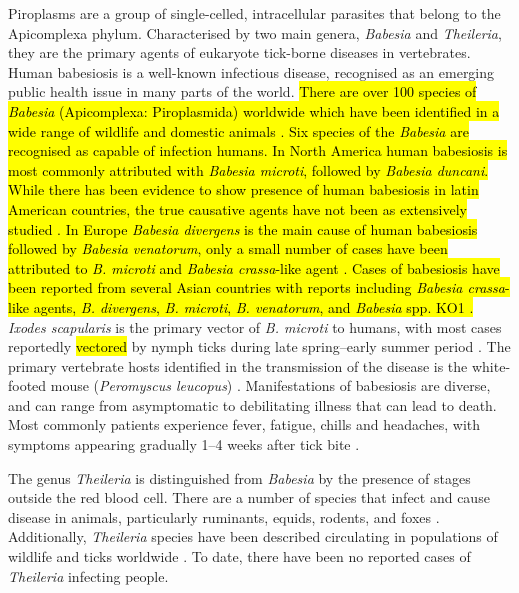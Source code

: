 \documentclass[a4paper, nobind]{templates/ociamthesis}
\begin{document}
Piroplasms are a group of single-celled, intracellular parasites that belong to the Apicomplexa phylum.
Characterised by two main genera, \emph{Babesia} and \emph{Theileria}, they are the primary agents of eukaryote tick-borne diseases in vertebrates.
Human babesiosis is a well-known infectious disease, recognised as an emerging public health issue in many parts of the world.
\hl{There are over 100 species of \emph{Babesia} (Apicomplexa: Piroplasmida) worldwide which have been identified in a wide range of wildlife and domestic animals \autocite{kumarGlobalEmergenceHuman2021}. Six species of the \emph{Babesia} are recognised as capable of infection humans. In North America human babesiosis is most commonly attributed with \emph{Babesia microti}, followed by \emph{Babesia duncani}. While there has been evidence to show presence of human babesiosis in latin American countries, the true causative agents have not been as extensively studied \autocite{kumarGlobalEmergenceHuman2021}. In Europe \emph{Babesia divergens} is the main cause of human babesiosis followed by \emph{Babesia venatorum}, only a small number of cases have been attributed to \emph{B. microti} and \emph{Babesia crassa}-like agent \autocite{hildebrandtHumanBabesiosisEurope2021,vannierHumanBabesiosis2012}. Cases of babesiosis have been reported from several Asian countries with reports including \emph{Babesia crassa}-like agents, \emph{B. divergens}, \emph{B. microti}, \emph{B. venatorum}, and \emph{Babesia} spp. KO1 \autocite{kumarGlobalEmergenceHuman2021}.}
\emph{Ixodes scapularis} is the primary vector of \emph{B. microti} to humans, with most cases reportedly \hl{vectored} by nymph ticks during late spring--early summer period \autocite{spielmanEcologyIxodesDamminiborne1985,swansonCoinfectionsAcquiredIxodes2006}.
The primary vertebrate hosts identified in the transmission of the disease is the white-footed mouse (\emph{Peromyscus leucopus}) \autocite{spielmanEcologyIxodesDamminiborne1985}.
Manifestations of babesiosis are diverse, and can range from asymptomatic to debilitating illness that can lead to death.
Most commonly patients experience fever, fatigue, chills and headaches, with symptoms appearing gradually 1--4 weeks after tick bite \autocite{vannierHumanBabesiosis2008}.

The genus \emph{Theileria} is distinguished from \emph{Babesia} by the presence of stages outside the red blood cell.
There are a number of species that infect and cause disease in animals, particularly ruminants, equids, rodents, and foxes \autocite{almazanBabesiosisTheileriosisNorth2022}.
Additionally, \emph{Theileria} species have been described circulating in populations of wildlife and ticks worldwide \autocite{mansReviewTheileriaDiagnostics2015,wattsTheileriaOrientalisReview2016}.
To date, there have been no reported cases of \emph{Theileria} infecting people.
\end{document}
